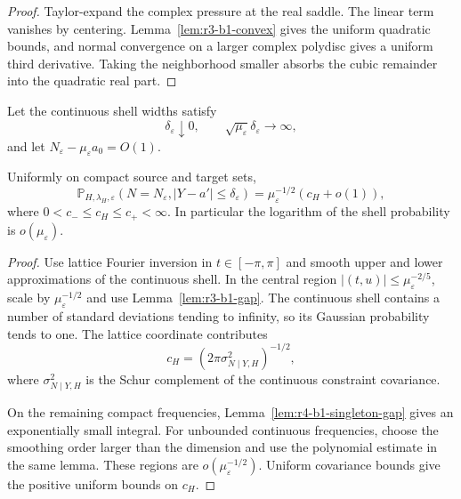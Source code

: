 \begin{proof}
Taylor-expand the complex pressure at the real saddle.  The linear term
vanishes by centering.  Lemma~\ref{lem:r3-b1-convex} gives the uniform
quadratic bounds, and normal convergence on a larger complex polydisc gives a
uniform third derivative.  Taking the neighborhood smaller absorbs the cubic
remainder into the quadratic real part.
\end{proof}

Let the continuous shell widths satisfy
\[
 \delta_\varepsilon\downarrow0,
 \qquad
 \sqrt{\mu_\varepsilon}\delta_\varepsilon\to\infty,
\]
and let \(N_\varepsilon-\mu_\varepsilon a_0=O(1)\).

\begin{theorem}
\label{thm:r3-b1-coefficient}
Uniformly on compact source and target sets,
\[
 \mathbb P_{H,\lambda_H,\varepsilon}
 \left(N=N_\varepsilon,
 |Y-a'|\le\delta_\varepsilon\right)
 =\mu_\varepsilon^{-1/2}(c_H+o(1)),
\]
where \(0<c_-\le c_H\le c_+<\infty\).  In particular the logarithm of the
shell probability is \(o(\mu_\varepsilon)\).
\end{theorem}

\begin{proof}
Use lattice Fourier inversion in \(t\in[-\pi,\pi]\) and smooth upper and lower
approximations of the continuous shell.  In the central region
\(|(t,u)|\le\mu_\varepsilon^{-2/5}\), scale by
\(\mu_\varepsilon^{-1/2}\) and use
Lemma~\ref{lem:r3-b1-gap}.  The continuous shell contains a number of standard
deviations tending to infinity, so its Gaussian probability tends to one.
The lattice coordinate contributes
\[
 c_H=(2\pi\sigma_{N\mid Y,H}^2)^{-1/2},
\]
where \(\sigma_{N\mid Y,H}^2\) is the Schur complement of the continuous
constraint covariance.

On the remaining compact frequencies,
Lemma~\ref{lem:r4-b1-singleton-gap} gives an exponentially small integral.
For unbounded continuous frequencies, choose the smoothing order larger than
the dimension and use the polynomial estimate in the same lemma.  These
regions are \(o(\mu_\varepsilon^{-1/2})\).  Uniform covariance bounds give
the positive uniform bounds on \(c_H\).
\end{proof}
